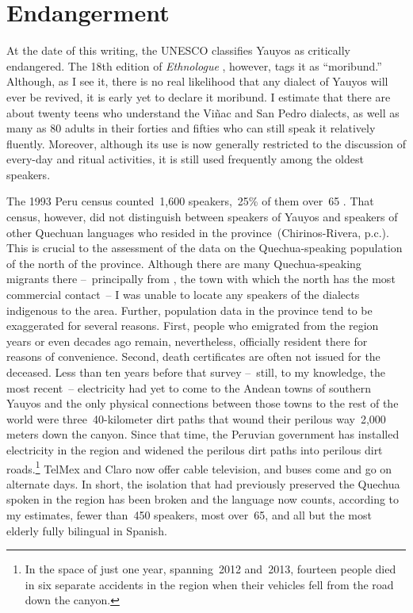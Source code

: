 \section{Endangerment}\label{sec:endangerment}
At the date of this writing, the UNESCO classifies Yauyos as critically endangered.
The 18th edition of \textit{Ethnologue} \citep{ethnologue}, however, tags it as “moribund.” Although, as I see it, there is no real likelihood that any dialect of Yauyos will ever be revived, it is early yet to declare it moribund. I estimate that there are about twenty teens who understand the Viñac and San Pedro dialects, as well as many as 80 adults in their forties and fifties who can still speak it relatively fluently. Moreover, although its use is now generally restricted to the discussion of every-day and ritual activities, it is still used frequently among the oldest speakers.

The 1993 Peru census counted~1,600 speakers,~25\%{} of them over~65 \citep[121]{Chirinos01}. That census, however, did not distinguish between speakers of Yauyos and speakers of other Quechuan languages who resided in the province~(Chirinos-Rivera, p.c.). This is crucial to the assessment of the data on the Quechua-speaking population of the north of the province. Although there are many Quechua-speaking migrants there --~principally from , the town with which the north has the most commercial contact~-- I was unable to locate any speakers of the dialects indigenous to the area. Further, population data in the province tend to be exaggerated for several reasons. First, people who emigrated from the region years or even decades ago remain, nevertheless, officially resident there for reasons of convenience. Second, death certificates are often not issued for the deceased. Less than ten years before that survey --~still, to my knowledge, the most recent~-- electricity had yet to come to the Andean towns of southern Yauyos and the only physical connections between those towns to the rest of the world were three~40-kilometer dirt paths that wound their perilous way~2,000 meters down the canyon. Since that time, the Peruvian government has installed electricity in the region and widened the perilous dirt paths into perilous dirt roads.\footnote{In the space of just one year, spanning~2012 and~2013, fourteen people died in six separate accidents in the region when their vehicles fell from the road down the canyon.} TelMex and Claro now offer cable television, and buses come and go on alternate days. In short, the isolation that had previously preserved the Quechua spoken in the region has been broken and the language now counts, according to my estimates, fewer than~450 speakers, most over~65, and all but the most elderly fully bilingual in Spanish. 

